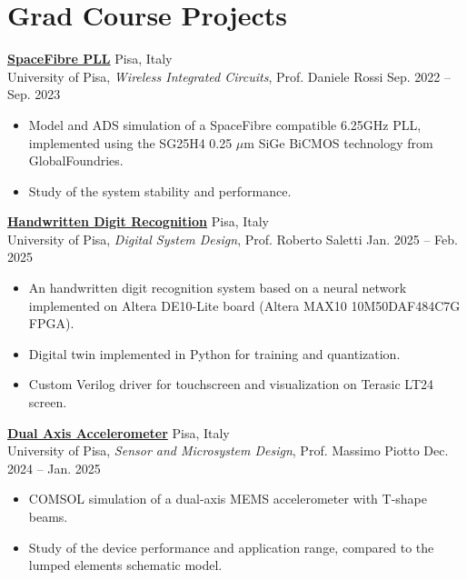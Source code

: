 \documentclass[10pt]{article}
\newcommand{\entry}[4]{{{\textbf{#1}}} \hfill #3 \\ #2 \hfill #4}
\begin{document}
\section{Grad Course Projects}

\entry{\href{https://github.com/leonardobove/spacefibre_pll}{SpaceFibre PLL}}{University of Pisa, \textit{Wireless Integrated Circuits}, Prof. Daniele Rossi}{Pisa, Italy}{Sep. 2022 -- Sep. 2023}
\begin{itemize}[noitemsep,leftmargin=3.5mm,rightmargin=0mm,topsep=6pt]
    \item Model and ADS simulation of a SpaceFibre compatible 6.25GHz PLL, implemented using the SG25H4 0.25 \(\mu\)m SiGe BiCMOS technology from GlobalFoundries.
    \item Study of the system stability and performance.
\end{itemize}

\smallskip

\entry{\href{https://github.com/leonardobove/handwritten_digit_recognition}{Handwritten Digit Recognition}}{University of Pisa, \textit{Digital System Design}, Prof. Roberto Saletti}{Pisa, Italy}{Jan. 2025 -- Feb. 2025}
\begin{itemize}[noitemsep,leftmargin=3.5mm,rightmargin=0mm,topsep=6pt]
    \item An handwritten digit recognition system based on a neural network implemented on Altera DE10-Lite board (Altera MAX10 10M50DAF484C7G FPGA).
    \item Digital twin implemented in Python for training and quantization.
    \item Custom Verilog driver for touchscreen and visualization on Terasic LT24 screen.
\end{itemize}

\smallskip

\entry{\href{https://github.com/leonardobove/dual_axis_accelerometer}{Dual Axis Accelerometer}}{University of Pisa, \textit{Sensor and Microsystem Design}, Prof. Massimo Piotto}{Pisa, Italy}{Dec. 2024 -- Jan. 2025}
\begin{itemize}[noitemsep,leftmargin=3.5mm,rightmargin=0mm,topsep=6pt]
    \item COMSOL simulation of a dual-axis MEMS accelerometer with T-shape beams.
    \item Study of the device performance and application range, compared to the lumped elements schematic model.
\end{itemize}

\smallskip
\end{document}
